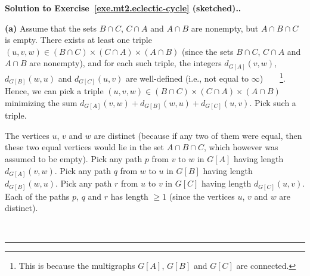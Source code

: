 \documentclass[numbers=enddot,12pt,final,onecolumn,notitlepage]{scrartcl}%
\theoremstyle{definition}
\newenvironment{proof}[1][Proof]{\noindent\textbf{#1.} }{\ \rule{0.5em}{0.5em}}
\newcommand{\tup}[1]{\left( #1 \right)}
\newcommand{\ive}[1]{\left[ #1 \right]}
\begin{document}
\begin{proof}[Solution to Exercise~\ref{exe.mt2.eclectic-cycle}
(sketched).]

\textbf{(a)} Assume that the sets $B \cap C$, $C \cap A$ and
$A \cap B$ are nonempty, but $A \cap B \cap C$ is empty.
There exists at least one triple
$\tup{u, v, w} \in \tup{B \cap C} \times \tup{C \cap A} \times
                    \tup{A \cap B}$
(since the sets $B \cap C$, $C \cap A$ and $A \cap B$ are nonempty),
and for each such triple, the integers
$d_{G \ive{A}} \tup{v, w}$, $d_{G \ive{B}} \tup{w, u}$ and
$d_{G \ive{C}} \tup{u, v}$ are well-defined (i.e., not equal to
$\infty$)\ \ \ \ \footnote{This is because
  the multigraphs $G \ive{A}$, $G \ive{B}$ and $G \ive{C}$
  are connected.}.
Hence, we can pick a triple
$\tup{u, v, w} \in \tup{B \cap C} \times \tup{C \cap A} \times
                    \tup{A \cap B}$
minimizing the sum
$d_{G \ive{A}} \tup{v, w} + d_{G \ive{B}} \tup{w, u}
 + d_{G \ive{C}} \tup{u, v}$.
Pick such a triple.

The vertices $u$, $v$ and $w$ are distinct (because if any two of them
were equal, then these two equal vertices would lie in the set
$A \cap B \cap C$, which however was assumed to be empty).
Pick any path $p$ from $v$ to $w$ in $G \ive{A}$ having length
$d_{G \ive{A}} \tup{v, w}$.
Pick any path $q$ from $w$ to $u$ in $G \ive{B}$ having length
$d_{G \ive{B}} \tup{w, u}$.
Pick any path $r$ from $u$ to $v$ in $G \ive{C}$ having length
$d_{G \ive{C}} \tup{u, v}$.
Each of the paths $p$, $q$ and $r$ has length $\geq 1$ (since the
vertices $u$, $v$ and $w$ are distinct).


\end{proof}
\end{document}
